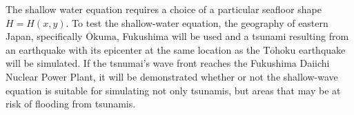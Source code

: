 \documentclass[../main.tex]{subfiles}
\begin{document}
The shallow water equation requires a choice of a particular seafloor shape $H=H(x,y)$. To test the shallow-water equation, the geography of eastern Japan, specifically $\overline{\text{O}}\text{kuma}$, Fukushima will be used and a tsunami resulting from an earthquake with its epicenter at the same location as the $\text{T}\overline{\text{o}}\text{hoku}$ earthquake will be simulated. If the tsnumai's wave front reaches the Fukushima Daiichi Nuclear Power Plant, it will be demonstrated whether or not the shallow-wave equation is suitable for simulating not only tsunamis, but areas that may be at risk of flooding from tsunamis.
\end{document}
